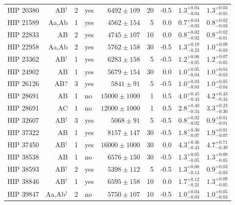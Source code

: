 {\begin{scriptsize}
\begin{longtable}{|l|rrlrrrll|}
  HIP 20380 & AB$^{\dagger}$ &     2 & yes &  $6492 \pm 109$ &      20 &    -0.5  &  $1.3^{+0.04}_{-0.04}$ &  $1.3^{+0.03}_{-0.05}$ \\
  HIP 21589 & Aa,Ab &     1 & yes &  $4562 \pm 154$ &       5 &     0.0  &  $0.7^{+0.04}_{-0.03}$ &  $0.8^{+0.02}_{-0.03}$ \\
  HIP 22833 & AB &     2 & yes &  $4745 \pm 107$ &      10 &     0.0  &  $0.8^{+0.02}_{-0.02}$ &  $0.8^{+0.02}_{-0.01}$ \\
  HIP 22958 & Aa,Ab &     2 & yes &  $5762 \pm 158$ &      30 &    -0.5  &  $1.3^{+0.19}_{-0.23}$ &  $1.0^{+0.09}_{-0.03}$ \\
  HIP 23362 & AB$^{\dagger}$ &     1 & yes &  $6283 \pm 158$ &       5 &    -0.5  &  $1.2^{+0.06}_{-0.05}$ &  $1.2^{+0.07}_{-0.05}$ \\
  HIP 24902 & AB &     1 & yes &  $5679 \pm 154$ &      30 &     0.0  &  $1.0^{+0.05}_{-0.04}$ &  $1.0^{+0.04}_{-0.03}$ \\
  HIP 26126 & AB? &     3 & yes &   $5841 \pm 91$ &       5 &    -0.5  &  $1.0^{+0.03}_{-0.03}$ &  $1.0^{+0.05}_{-0.04}$ \\
  HIP 28691 & AB &     1 & no &  $15000 \pm 1000$ &      1 &     0.5 &  $4.0^{+0.45}_{-0.43}$ &  $4.2^{+0.43}_{-0.34}$ \\
  HIP 28691 & AC &     1 & no &  $12000 \pm 1000$ &      1 &     0.5 &  $2.8^{+0.40}_{-0.34}$ &  $3.3^{+0.23}_{-0.30}$ \\
  HIP 32607 & AB$^{\dagger}$ &     3 & yes &   $5068 \pm 91$ &       5 &    -0.5  &  $0.8^{+0.02}_{-0.02}$ &  $0.9^{+0.01}_{-0.01}$ \\
  HIP 37322 & AB &     1 & yes &    $8157 \pm 147$ &     30 &    -0.5 &  $1.8^{+0.30}_{-0.07}$ &  $1.9^{+0.01}_{-0.07}$ \\
  HIP 37450 & AB$^{\dagger}$ &     1 & yes &  $16000 \pm 1000$ &     30 &     0.0 &  $4.3^{+0.36}_{-0.43}$ &  $4.7^{+0.71}_{-0.39}$ \\
  HIP 38538 & AB      &     1 & no &   $6576 \pm 150$ &      30 &    -0.5  &  $1.3^{+0.05}_{-0.05}$ &  $1.3^{+0.09}_{-0.05}$ \\
  HIP 38593 & AB$^{\dagger}$ &     2 & yes &  $5398 \pm 112$ &       5 &    -0.5  &  $1.3^{+0.08}_{-0.13}$ &  $0.9^{+0.03}_{-0.03}$ \\
  HIP 38846 & AB$^{\dagger}$ &     1 & yes &  $6595 \pm 158$ &      10 &     0.0  &  $1.7^{+0.12}_{-0.21}$ &  $1.3^{+0.09}_{-0.05}$ \\
  HIP 39847 & Aa,Ab$^{\dagger}$ &     2 & no &  $5750 \pm 107$ &      10 &    -0.5  &  $1.0^{+0.04}_{-0.03}$ &  $1.0^{+0.05}_{-0.03}$ \\

\end{longtable}
\end{scriptsize}}
